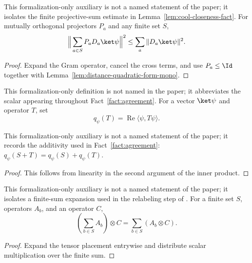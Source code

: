 \begin{lemma}
	\label{lem:distance-projective-sum}
	\leanok
	This formalization-only auxiliary is not a named statement of the paper; it
	isolates the finite projective-sum estimate in
	Lemma~\ref{lem:cool-closeness-fact}. For mutually orthogonal projectors
	$P_a$ and any finite set $S$,
	\[
		\Big\|\sum_{a\in S}P_aD_a\ket\psi\Big\|^2
		\leq\sum_a\|D_a\ket\psi\|^2.
	\]
\end{lemma}
\begin{proof}
	\leanok
	Expand the Gram operator, cancel the cross terms, and use $P_a\leq\Id$
	together with Lemma~\ref{lem:distance-quadratic-form-mono}.
\end{proof}

\begin{definition}
	\label{def:distance-state-quadratic-form}
	\leanok
	This formalization-only definition is not named in the paper; it abbreviates
	the scalar appearing throughout Fact~\ref{fact:agreement}. For a vector
	$\ket\psi$ and operator $T$, set
	\[
		q_\psi(T)=\operatorname{Re}\langle\psi,T\psi\rangle.
	\]
\end{definition}

\begin{lemma}
	\label{lem:distance-state-quadratic-form-add}
	\leanok
	This formalization-only auxiliary is not a named statement of the paper; it
	records the additivity used in Fact~\ref{fact:agreement}:
	$q_\psi(S+T)=q_\psi(S)+q_\psi(T)$.
\end{lemma}
\begin{proof}
	\leanok
	This follows from linearity in the second argument of the inner product.
\end{proof}

\begin{lemma}
	\label{lem:distance-tensor-sum-left}
	\leanok
	This formalization-only auxiliary is not a named statement of the paper; it
	isolates a finite-sum expansion used in the relabeling step of
	\cite[Fact~4.34]{Natarajan2018NEEXP}. For a finite set $S$, operators $A_b$, and an
	operator $C$,
	\[
		\left(\sum_{b\in S}A_b\right)\otimes C
		=\sum_{b\in S}(A_b\otimes C).
	\]
\end{lemma}
\begin{proof}
	\leanok
	Expand the tensor placement entrywise and distribute scalar multiplication
	over the finite sum.
\end{proof}

